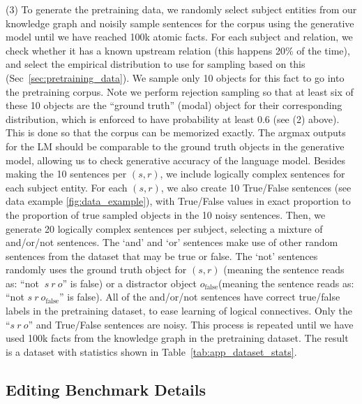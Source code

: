 \documentclass[11pt,a4paper]{article}
\begin{document}
(3) To generate the pretraining data, we randomly select subject entities from our knowledge graph and noisily sample sentences for the corpus using the generative model until we have reached 100k atomic facts. For each subject and relation, we check whether it has a known upstream relation (this happens 20\% of the time), and select the empirical distribution to use for sampling based on this (Sec~\ref{sec:pretraining_data}). We sample only 10 objects for this fact to go into the pretraining corpus. Note we perform rejection sampling so that at least six of these 10 objects are the ``ground truth'' (modal) object for their corresponding distribution, which is enforced to have probability at least 0.6 (see (2) above). This is done so that the corpus can be memorized exactly. The argmax outputs for the LM should be comparable to the ground truth objects in the generative model, allowing us to check generative accuracy of the language model. Besides making the 10 sentences per $(s,r)$, we include logically complex sentences for each subject entity. For each $(s,r)$, we also create 10 True/False sentences (see data example \ref{fig:data_example}), with True/False values in exact proportion to the proportion of true sampled objects in the 10 noisy sentences. Then, we generate 20 logically complex sentences per subject, selecting a mixture of and/or/not sentences. The `and' and `or' sentences make use of other random sentences from the dataset that may be true or false. The `not' sentences randomly uses the ground truth object for $(s,r)$ (meaning the sentence reads as: ``not $\ s \ r \ o$'' is false) or a distractor object $o_\textrm{false}$(meaning the sentence reads as: ``not $s \ r \ o_\textrm{false}$'' is false). All of the and/or/not sentences have correct true/false labels in the pretraining dataset, to ease learning of logical connectives. Only the ``$s \ r \ o$'' and True/False sentences are noisy. This process is repeated until we have used 100k facts from the knowledge graph in the pretraining dataset. The result is a dataset with statistics shown in Table~\ref{tab:app_dataset_stats}.

\subsection{Editing Benchmark Details}
\end{document}
